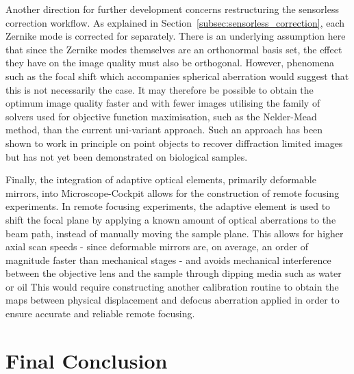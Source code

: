Another direction for further development concerns restructuring the 
sensorless correction workflow. As explained in 
Section~\ref{subsec:sensorless_correction}, each Zernike mode is corrected 
for separately. There is an underlying assumption here that since the 
Zernike modes themselves are an orthonormal basis set, the effect they have 
on the image quality must also be orthogonal. However, phenomena such as 
the focal shift which accompanies spherical aberration would suggest that 
this is not necessarily the case\cite{torok1997role}. It may therefore be 
possible to obtain the optimum image quality faster and with fewer images 
utilising the family of solvers used for objective function maximisation, 
such as the Nelder-Mead method, than the current uni-variant 
approach\cite{nelder1965simplex}. Such an approach has been shown to work 
in principle on point objects to recover diffraction limited images but has 
not yet been demonstrated on biological samples\cite{murray2005wavefront}.

Finally, the integration of adaptive optical elements, primarily deformable 
mirrors, into Microscope-Cockpit allows for the construction of remote focusing 
experiments. In remote focusing experiments, the adaptive element is used 
to shift the focal plane by applying a known amount of optical aberrations 
to the beam path, instead of manually moving the sample plane. This allows 
for higher axial scan speeds - since deformable mirrors are, on average, an 
order of magnitude faster than mechanical stages - and avoids mechanical 
interference between the objective lens and the sample through dipping 
media such as water or oil\cite{botcherby2008optical,vzurauskas2017rapid} 
This would require constructing another calibration routine to obtain the 
maps between physical displacement and defocus aberration applied in order 
to ensure accurate and reliable remote focusing.

\section{Final Conclusion}
\label{sec:final_conclusion}

